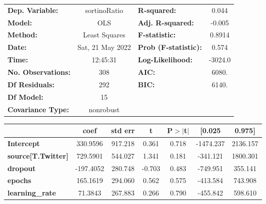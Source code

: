 \begin{center}
\begin{tabular}{lclc}
\toprule
\textbf{Dep. Variable:}              &   sortinoRatio   & \textbf{  R-squared:         } &     0.044   \\
\textbf{Model:}                      &       OLS        & \textbf{  Adj. R-squared:    } &    -0.005   \\
\textbf{Method:}                     &  Least Squares   & \textbf{  F-statistic:       } &    0.8914   \\
\textbf{Date:}                       & Sat, 21 May 2022 & \textbf{  Prob (F-statistic):} &    0.574    \\
\textbf{Time:}                       &     12:45:31     & \textbf{  Log-Likelihood:    } &   -3024.0   \\
\textbf{No. Observations:}           &         308      & \textbf{  AIC:               } &     6080.   \\
\textbf{Df Residuals:}               &         292      & \textbf{  BIC:               } &     6140.   \\
\textbf{Df Model:}                   &          15      & \textbf{                     } &             \\
\textbf{Covariance Type:}            &    nonrobust     & \textbf{                     } &             \\
\bottomrule
\end{tabular}
\begin{tabular}{lcccccc}
                                     & \textbf{coef} & \textbf{std err} & \textbf{t} & \textbf{P$> |$t$|$} & \textbf{[0.025} & \textbf{0.975]}  \\
\midrule
\textbf{Intercept}                   &     330.9596  &      917.218     &     0.361  &         0.718        &    -1474.237    &     2136.157     \\
\textbf{source[T.Twitter]}           &     729.5901  &      544.027     &     1.341  &         0.181        &     -341.121    &     1800.301     \\
\textbf{dropout}                     &    -197.4052  &      280.748     &    -0.703  &         0.483        &     -749.951    &      355.141     \\
\textbf{epochs}                      &     165.1619  &      294.060     &     0.562  &         0.575        &     -413.584    &      743.908     \\
\textbf{learning\_rate}              &      71.3843  &      267.883     &     0.266  &         0.790        &     -455.842    &      598.610     \\

\end{tabular}
\end{center}
